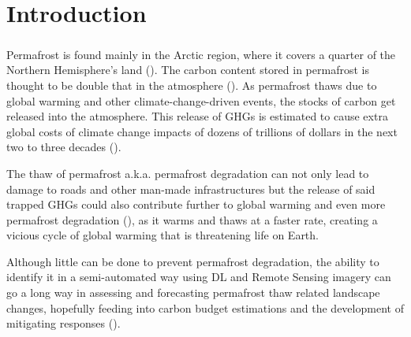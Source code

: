 

\chapter{Introduction}
\label{introduction}



\paragraph{}
Permafrost is found mainly in the Arctic region, where it covers a quarter of the Northern Hemisphere's land (\cite{OLTHOF2015194}). The carbon content stored in permafrost is thought to be double that in the atmosphere (\cite{climatechange12}). As permafrost thaws due to global warming and other climate-change-driven events, the stocks of carbon get released into the atmosphere. This release of \gls{GHGs} is estimated to cause extra global costs of climate change impacts of dozens of trillions of dollars in the next two to three decades (\cite{climatechange34}). 

The thaw of permafrost \gls{a.k.a.} permafrost degradation can not only lead to damage to roads and other man-made infrastructures but the release of said trapped \gls{GHGs} could also contribute further to global warming and even more permafrost degradation (\cite{MURTON2021857}), as it warms and thaws at a faster rate, creating a vicious cycle of global warming that is threatening life on Earth.

Although little can be done to prevent permafrost degradation, the ability to identify it in a semi-automated way using \gls{DL} and Remote Sensing imagery can go a long way in assessing and forecasting permafrost thaw related landscape changes, hopefully feeding into carbon budget estimations and the development of mitigating responses (\cite{monitoringperma}).

